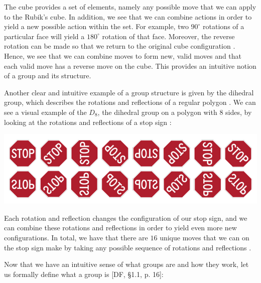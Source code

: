 \documentclass[11pt, reqno]{amsart}
\theoremstyle{plain}
\theoremstyle{definition}
\theoremstyle{example}
\begin{document}
\par
The cube provides a set of elements, namely any possible move that we can apply to the Rubik's cube. In addition, we see that we can combine actions in order to yield a new possible action within the set. For example, two $90^{\circ}$ rotations of a particular face will yield a $180^{\circ}$ rotation of that face. Moreover, the reverse rotation can be made so that we return to the original cube configuration \cite{carter}. Hence, we see that we can combine moves to form new, valid moves and that each valid move has a reverse move on the cube. This provides an intuitive notion of a group and its structure.

\par
Another clear and intuitive example of a group structure is given by the dihedral group, which describes the rotations and reflections of a regular polygon \cite{dummit, dihedralwiki}. We can see a visual example of the $D_8$, the dihedral group on a polygon with $8$ sides, by looking at the rotations and reflections of a stop sign \cite{dihedralwiki}:

\includegraphics[scale=0.65]{Dihedral8}

Each rotation and reflection changes the configuration of our stop sign, and we can combine these rotations and reflections in order to yield even more new configurations. In total, we have that there are $16$ unique moves that we can on the stop sign make by taking any possible sequence of rotations and reflections \cite{dihedralwiki}.

\newpage
\par
Now that we have an intuitive sense of what groups are and how they work, let us formally define what a group is [DF, \S 1.1, p. 16]:
\end{document}
